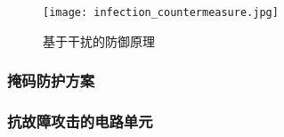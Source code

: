 \documentclass[a4paper,12pt]{article}
\begin{document}
\begin{CJK}{UTF8}{gkai}
\begin{figure}
\centering
\caption{基于干扰的防御原理}
\texttt{[image: infection\_countermeasure.jpg]}
\label{infection_countermeasure}
\end{figure}

\subsubsection{掩码防护方案}
\subsubsection{抗故障攻击的电路单元}
\end{CJK}
\end{document}
